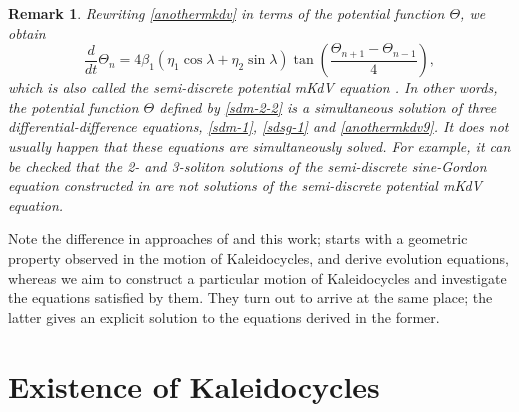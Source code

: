 \documentclass[10pt,leqno]{amsart}
\newtheorem{remark}[theorem]{Remark}
\numberwithin{equation}{section}
\begin{document}
\begin{remark}
Rewriting \eqref{anothermkdv} in terms of the potential function $\Theta$, we obtain
\begin{equation}\label{anothermkdv9}
\frac{d}{dt}\Theta_{n}=4\beta_{1}\left(\eta_{1}\cos\lambda+\eta_{2}\sin\lambda\right)\tan\left(\frac{\Theta_{n+1}-\Theta_{n-1}}{4}\right),
\end{equation}
which is also called the \emph{semi-discrete potential mKdV equation} \cite{inoguchi2012explicit,hoffmann2004discrete,feng2011discrete}. In other words, the potential function $\Theta$ defined by \eqref{sdm-2-2} is a simultaneous solution of three differential-difference equations, \eqref{sdm-1}, \eqref{sdsg-1} and \eqref{anothermkdv9}. It does not usually happen that these equations are simultaneously solved. For example, it can be checked  that the 2- and 3-soliton solutions of the semi-discrete sine-Gordon equation constructed in \cite{feng2011discrete,feng2010integrable} are not solutions of the semi-discrete potential mKdV equation.
\end{remark}



Note the difference in approaches of 
\cite{KKP:linkage} and this work;
\cite{KKP:linkage} starts with a geometric property
observed in the motion of Kaleidocycles, and derive evolution equations,
whereas we aim to construct a particular motion of Kaleidocycles and investigate the equations satisfied by them.
They turn out to arrive at the same place; 
the latter gives an explicit solution to the equations derived in the former.



\section{Existence of Kaleidocycles}\label{section:Necessary and sufficient conditions for closedness}
\end{document}
